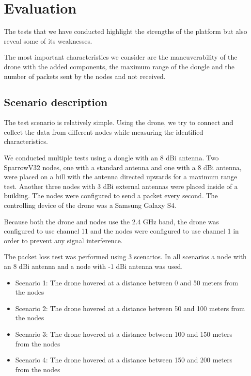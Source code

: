 \normalfont\normalsize
\chapter{Evaluation}

The tests that we have conducted highlight the strengths of the platform but also reveal some of its weaknesses.

The most important characteristics we consider are the maneuverability of the drone with the added components, the maximum range of the dongle and the number of packets sent by the nodes and not received.
 

\section{Scenario description}

The test scenario is relatively simple. Using the drone, we try to connect and collect the data from different nodes while measuring the identified characteristics.

We conducted multiple tests using a dongle with an 8 dBi antenna. Two SparrowV32 nodes, one with a standard antenna and one with a 8 dBi antenna, were placed on a hill with the antenna directed upwards for a maximum range test. Another three nodes with 3 dBi external antennas were placed inside of a building. The nodes were configured to send a packet every second. The controlling device of the drone was a Samsung Galaxy S4.

Because both the drone and nodes use the 2.4 GHz band, the drone was configured to use channel 11 and the nodes were configured to use channel 1 in order to prevent any signal interference.

The packet loss test was performed using 3 scenarios. In all scenarios a node with an 8 dBi antenna and a node with -1 dBi antenna was used. 
 
\begin{itemize}

\item Scenario 1: The drone hovered at a distance between 0 and 50 meters from the nodes
\item Scenario 2: The drone hovered at a distance between 50 and 100 meters from the nodes
\item Scenario 3: The drone hovered at a distance between 100 and 150 meters from the nodes
\item Scenario 4: The drone hovered at a distance between 150 and 200 meters from the nodes

\end{itemize}



